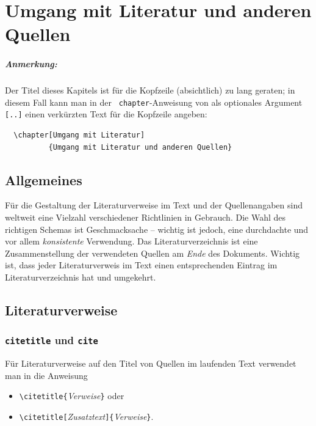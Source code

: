 \chapter[Umgang mit Literatur]{Umgang mit Literatur und anderen Quellen}
\label{cha:Literatur}


\paragraph{Anmerkung:}
Der Titel dieses Kapitels ist für die Kopfzeile (absichtlich) zu
lang geraten; in diesem Fall kann man in der {\tt
chapter}-Anweisung von \latex als optionales Argument \verb![..]! einen verkürzten Text für die
Kopfzeile angeben:
\begin{verbatim}
  \chapter[Umgang mit Literatur]
          {Umgang mit Literatur und anderen Quellen}
\end{verbatim}

\section{Allgemeines}

Für die Gestaltung der Literaturverweise im Text und der
Quellenangaben sind weltweit eine Vielzahl verschiedener Richtlinien in
Gebrauch. Die Wahl des richtigen Schemas ist Geschmacksache -- wichtig ist jedoch,
eine durchdachte und vor allem \emph{konsistente} Verwendung.
Das Literaturverzeichnis ist eine
Zusammenstellung der verwendeten Quellen am \emph{Ende} des Dokuments.
Wichtig ist, dass jeder Literaturverweis im Text einen entsprechenden
Eintrag im Literaturverzeichnis hat und umgekehrt.

\section{Literaturverweise}

\subsection{{\tt citetitle} und {\tt cite}}

Für Literaturverweise auf den Titel von Quellen im laufenden Text verwendet man in \latex die Anweisung
\begin{itemize}
\item[] \verb!\citetitle{!\textit{Verweise}\verb!}! oder
\item[] \verb!\citetitle[!\textit{Zusatztext}\verb!]{!\textit{Verweise}\verb!}!.
\end{itemize}

